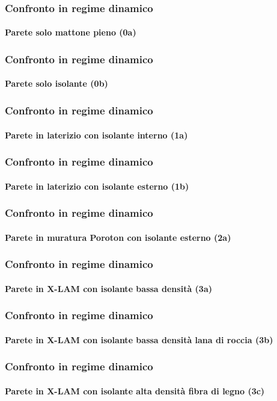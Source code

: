 \documentclass[aspectratio=141,10pt]{beamer}
\begin{document}
\begin{frame}
    \frametitle{Confronto in regime dinamico}
    \framesubtitle{Parete solo mattone pieno (0a)}
    
\end{frame}
\begin{frame}
    \frametitle{Confronto in regime dinamico}
    \framesubtitle{Parete solo isolante (0b)}
    
\end{frame}
\begin{frame}
    \frametitle{Confronto in regime dinamico}
    \framesubtitle{Parete in laterizio con isolante interno (1a)}
    
\end{frame}
\begin{frame}
    \frametitle{Confronto in regime dinamico}
    \framesubtitle{Parete in laterizio con isolante esterno (1b)}
    
\end{frame}
\begin{frame}
    \frametitle{Confronto in regime dinamico}
    \framesubtitle{Parete in muratura Poroton con isolante esterno (2a)}
    
\end{frame}
\begin{frame}
    \frametitle{Confronto in regime dinamico}
    \framesubtitle{Parete in X-LAM con isolante bassa densità (3a)}
    
\end{frame}
\begin{frame}
    \frametitle{Confronto in regime dinamico}
    \framesubtitle{Parete in X-LAM con isolante bassa densità lana di roccia (3b)}
    
\end{frame}
\begin{frame}
    \frametitle{Confronto in regime dinamico}
    \framesubtitle{Parete in X-LAM con isolante alta densità fibra di legno (3c)}
    
\end{frame}
\end{document}
